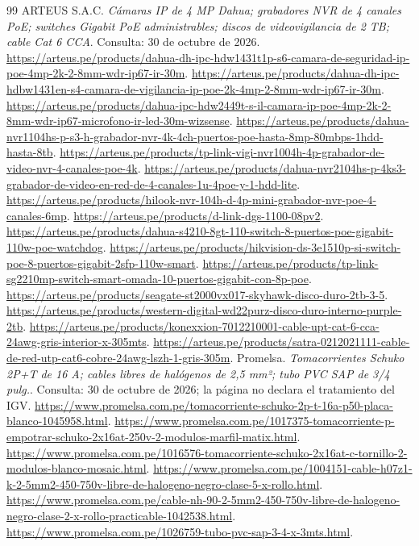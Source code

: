 \begin{thebibliography}{99}
 ARTEUS S.A.C. \emph{Cámaras IP de 4 MP Dahua; grabadores NVR de 4 canales PoE; switches Gigabit PoE administrables; discos de videovigilancia de 2 TB; cable Cat 6 CCA}. Consulta: 30 de octubre de 2026. \url{https://arteus.pe/products/dahua-dh-ipc-hdw1431t1p-s6-camara-de-seguridad-ip-poe-4mp-2k-2-8mm-wdr-ip67-ir-30m}. \url{https://arteus.pe/products/dahua-dh-ipc-hdbw1431en-s4-camara-de-vigilancia-ip-poe-2k-4mp-2-8mm-wdr-ip67-ir-30m}. \url{https://arteus.pe/products/dahua-ipc-hdw2449t-s-il-camara-ip-poe-4mp-2k-2-8mm-wdr-ip67-microfono-ir-led-30m-wizsense}. \url{https://arteus.pe/products/dahua-nvr1104hs-p-s3-h-grabador-nvr-4k-4ch-puertos-poe-hasta-8mp-80mbps-1hdd-hasta-8tb}. \url{https://arteus.pe/products/tp-link-vigi-nvr1004h-4p-grabador-de-video-nvr-4-canales-poe-4k}. \url{https://arteus.pe/products/dahua-nvr2104hs-p-4ks3-grabador-de-video-en-red-de-4-canales-1u-4poe-y-1-hdd-lite}. \url{https://arteus.pe/products/hilook-nvr-104h-d-4p-mini-grabador-nvr-poe-4-canales-6mp}. \url{https://arteus.pe/products/d-link-dgs-1100-08pv2}. \url{https://arteus.pe/products/dahua-s4210-8gt-110-switch-8-puertos-poe-gigabit-110w-poe-watchdog}. \url{https://arteus.pe/products/hikvision-ds-3e1510p-si-switch-poe-8-puertos-gigabit-2sfp-110w-smart}. \url{https://arteus.pe/products/tp-link-sg2210mp-switch-smart-omada-10-puertos-gigabit-con-8p-poe}. \url{https://arteus.pe/products/seagate-st2000vx017-skyhawk-disco-duro-2tb-3-5}. \url{https://arteus.pe/products/western-digital-wd22purz-disco-duro-interno-purple-2tb}. \url{https://arteus.pe/products/konexxion-7012210001-cable-upt-cat-6-cca-24awg-gris-interior-x-305mts}. \url{https://arteus.pe/products/satra-0212021111-cable-de-red-utp-cat6-cobre-24awg-lszh-1-gris-305m}.
 Promelsa. \emph{Tomacorrientes Schuko 2P+T de 16 A; cables libres de halógenos de 2,5 mm²; tubo PVC SAP de 3/4 pulg.}. Consulta: 30 de octubre de 2026; la página no declara el tratamiento del IGV. \url{https://www.promelsa.com.pe/tomacorriente-schuko-2p-t-16a-p50-placa-blanco-1045958.html}. \url{https://www.promelsa.com.pe/1017375-tomacorriente-p-empotrar-schuko-2x16at-250v-2-modulos-marfil-matix.html}. \url{https://www.promelsa.com.pe/1016576-tomacorriente-schuko-2x16at-c-tornillo-2-modulos-blanco-mosaic.html}. \url{https://www.promelsa.com.pe/1004151-cable-h07z1-k-2-5mm2-450-750v-libre-de-halogeno-negro-clase-5-x-rollo.html}. \url{https://www.promelsa.com.pe/cable-nh-90-2-5mm2-450-750v-libre-de-halogeno-negro-clase-2-x-rollo-practicable-1042538.html}. \url{https://www.promelsa.com.pe/1026759-tubo-pvc-sap-3-4-x-3mts.html}.

\end{thebibliography}
